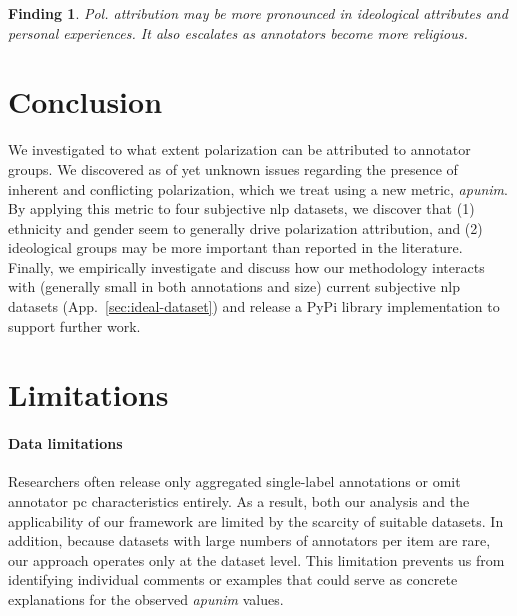 \documentclass{article} %
\theoremstyle{definition}
\theoremstyle{plain}
\newtheorem{finding}{Finding}
\begin{document}
\begin{finding}
	\label{finding:ideology}
	Pol. attribution may be more pronounced in ideological attributes and personal experiences. It also escalates as annotators become more religious.
\end{finding}


\section{Conclusion}
\label{sec:conclusion}

We investigated to what extent polarization can be attributed to annotator groups. We discovered as of yet unknown issues regarding the presence of inherent and conflicting polarization, which we treat using a new metric, \textit{apunim}. By applying this metric to four subjective \ac{nlp} datasets, we discover that (1) ethnicity and gender seem to generally drive polarization attribution, and (2) ideological groups may be more important than reported in the literature. Finally, we empirically investigate and discuss how our methodology interacts with (generally small in both annotations and size) current subjective \ac{nlp} datasets (App.~\ref{sec:ideal-dataset}) and release a PyPi library implementation to support further work.



\section*{Limitations}

\paragraph{Data limitations} Researchers often release only aggregated single-label annotations or omit annotator \ac{pc} characteristics entirely. As a result, both our analysis and the applicability of our framework are limited by the scarcity of suitable datasets. In addition, because datasets with large numbers of annotators per item are rare, our approach operates only at the dataset level. This limitation prevents us from identifying individual comments or examples that could serve as concrete explanations for the observed \textit{apunim} values.
\end{document}
